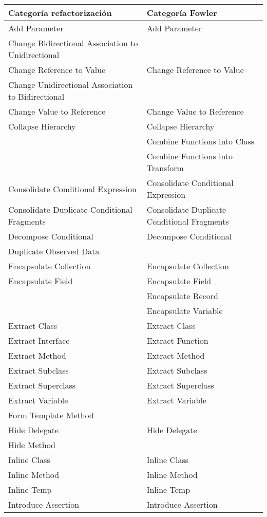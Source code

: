 \documentclass[11pt,a4paper,oneside]{book}
\begin{document}
\begin{longtable}{|p{200pt}|p{200pt}|}
\footnotesize
Categoría refactorización & Categoría Fowler\\ 
\hline
    Add Parameter & Add Parameter\\ 
    Change Bidirectional Association to Unidirectional & \\ 
    Change Reference to Value & Change Reference to Value\\ 
    Change Unidirectional Association to Bidirectional & \\ 
    Change Value to Reference & Change Value to Reference\\ 
    Collapse Hierarchy & Collapse Hierarchy\\ 
 & Combine Functions into Class\\ 
 & Combine Functions into Transform\\ 
    Consolidate Conditional Expression & Consolidate Conditional Expression\\ 
    Consolidate Duplicate Conditional Fragments & Consolidate Duplicate Conditional Fragments\\ 
    Decompose Conditional & Decompose Conditional\\ 
    Duplicate Observed Data & \\ 
    Encapsulate Collection & Encapsulate Collection\\ 
    Encapsulate Field & Encapsulate Field \\ 
 & Encapsulate Record\\ 
 & Encapsulate Variable\\ 
    Extract Class & Extract Class\\ 
    Extract Interface & Extract Function\\ 
    Extract Method & Extract Method\\ 
    Extract Subclass & Extract Subclass \\ 
    Extract Superclass & Extract Superclass\\ 
    Extract Variable & Extract Variable\\ 
    Form Template Method & \\ 
    Hide Delegate & Hide Delegate\\ 
    Hide Method & \\ 
    Inline Class & Inline Class\\ 
    Inline Method & Inline Method\\ 
    Inline Temp & Inline Temp\\ 
    Introduce Assertion & Introduce Assertion\\ 

\end{longtable}
\end{document}
